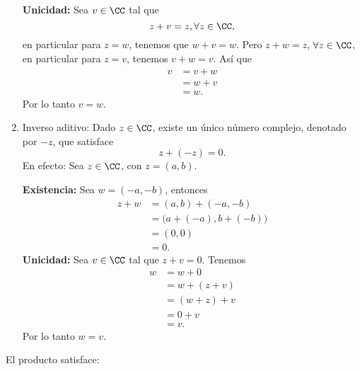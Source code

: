 \begin{enumerate}[label=A\arabic*.]
    \textbf{Unicidad:} Sea $v \in \CC$ tal que
    $$z + v = z, \forall z \in \CC,$$
    en particular para $z = w$, tenemos que $w + v = w$. Pero $z + w = z$, $\forall z \in \CC$, en particular para $z = v$, tenemos $v + w = v$. Así que
    \begin{align*}
        v & = v + w \\
        & = w + v \\
        & = w.
    \end{align*}
    Por lo tanto $v = w$.\newpage
    \item Inverso aditivo: Dado $z \in \CC$, existe un único número complejo, denotado por $-z$, que satisface
    $$z + (-z) = 0.$$
    En efecto: Sea $z \in \CC$, con $z = (a, b)$.
    
    \textbf{Existencia:} Sea $w = (-a, -b)$, entonces
    \begin{align*}
        z + w & = (a, b) + (-a, -b) \\
        & = \big(a + (-a), b + (-b)\big) \\
        & = (0, 0) \\
        & = 0.
    \end{align*}
    \textbf{Unicidad:} Sea $v \in \CC$ tal que $z + v = 0$. Tenemos
    \begin{align*}
        w & = w + 0 \\
        & = w + (z + v) \\
        & = (w + z) + v \\
        & = 0 + v \\
        & = v.
    \end{align*}
    Por lo tanto $w = v$.
\end{enumerate}
El producto satisface:
